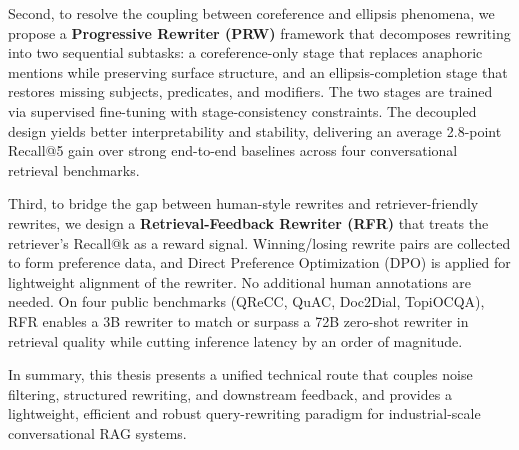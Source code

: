 Second, to resolve the coupling between coreference and ellipsis phenomena, we propose a \textbf{Progressive Rewriter (PRW)} framework that decomposes rewriting into two sequential subtasks: a coreference-only stage that replaces anaphoric mentions while preserving surface structure, and an ellipsis-completion stage that restores missing subjects, predicates, and modifiers. The two stages are trained via supervised fine-tuning with stage-consistency constraints. The decoupled design yields better interpretability and stability, delivering an average 2.8-point Recall@5 gain over strong end-to-end baselines across four conversational retrieval benchmarks.

Third, to bridge the gap between human-style rewrites and retriever-friendly rewrites, we design a \textbf{Retrieval-Feedback Rewriter (RFR)} that treats the retriever's Recall@k as a reward signal. Winning/losing rewrite pairs are collected to form preference data, and Direct Preference Optimization (DPO) is applied for lightweight alignment of the rewriter. No additional human annotations are needed. On four public benchmarks (QReCC, QuAC, Doc2Dial, TopiOCQA), RFR enables a 3B rewriter to match or surpass a 72B zero-shot rewriter in retrieval quality while cutting inference latency by an order of magnitude.

In summary, this thesis presents a unified technical route that couples noise filtering, structured rewriting, and downstream feedback, and provides a lightweight, efficient and robust query-rewriting paradigm for industrial-scale conversational RAG systems.

